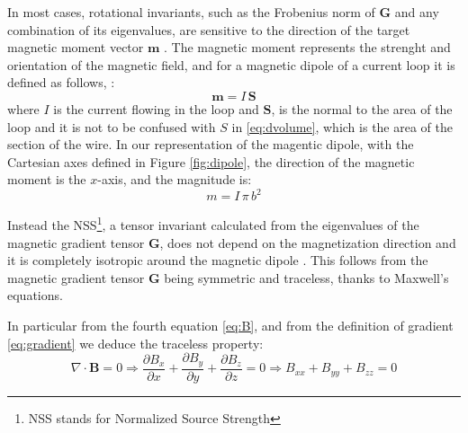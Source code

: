 In most cases, rotational invariants,
such as the Frobenius norm of $\mathbf{G}$ and any combination of its
eigenvalues, are sensitive to the direction of the target magnetic
moment vector $\mathbf{m}$ \cite{NSS_single_localization}. The magnetic moment represents the strenght 
and orientation of the magnetic field, and for a magnetic dipole of a current
loop it is defined as follows, \cite{book-magnetism}:
\begin{equation}
    \mathbf{m} = I \, \mathbf{S}
\end{equation}
where $I$ is the current flowing in the loop and $\mathbf{S}$, is the normal to the area of the loop
and it is not to be confused with $S$ in \ref{eq:dvolume}, which is the area
of the section of the wire.
In our representation of the magentic dipole, with the Cartesian axes
defined in Figure \ref{fig:dipole}, the direction of the magnetic moment is the $x$-axis,
and the magnitude is:
\begin{equation}
    m = I \, \pi \, b^2
    \label{eq:magnetic_moment}  
\end{equation}

Instead the NSS\footnote{NSS stands for Normalized Source Strength}, a tensor invariant calculated 
from the eigenvalues of the magnetic gradient tensor $\mathbf{G}$, 
does not depend on the magnetization direction and it 
is completely isotropic around the magnetic dipole \cite{multiple_real_plots_invariants}.
This follows from the magnetic gradient tensor $\mathbf{G}$ being symmetric and traceless,
thanks to Maxwell's equations.

In particular from the fourth equation \ref{eq:B}, 
and from the definition of gradient \ref{eq:gradient} we deduce the traceless property:
\begin{equation}
    \nabla \cdot \mathbf{B} = 0
    \Rightarrow
    \frac{\partial B_x}{\partial x} +\frac{\partial B_y}{\partial y} + \frac{\partial B_z}{\partial z} = 0
    \Rightarrow
    B_{xx} + B_{yy} + B_{zz} = 0
\end{equation}

